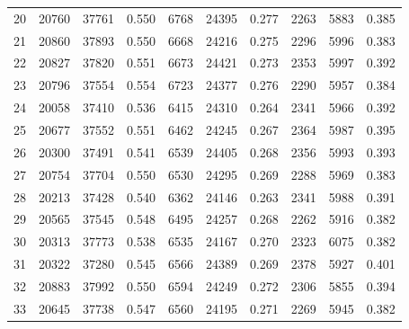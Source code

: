 \begin{table}
\begin{tabular}{c|C{1cm}C{1cm}C{1cm}|C{1cm}C{1cm}C{1cm}|C{1cm}C{1cm}C{1cm}}
20 & 20760 & 37761 & 0.550 & 6768 & 24395 & 0.277 & 2263 & 5883 & 0.385 \\
21 & 20860 & 37893 & 0.550 & 6668 & 24216 & 0.275 & 2296 & 5996 & 0.383 \\
22 & 20827 & 37820 & 0.551 & 6673 & 24421 & 0.273 & 2353 & 5997 & 0.392 \\
23 & 20796 & 37554 & 0.554 & 6723 & 24377 & 0.276 & 2290 & 5957 & 0.384 \\
24 & 20058 & 37410 & 0.536 & 6415 & 24310 & 0.264 & 2341 & 5966 & 0.392 \\
25 & 20677 & 37552 & 0.551 & 6462 & 24245 & 0.267 & 2364 & 5987 & 0.395 \\
26 & 20300 & 37491 & 0.541 & 6539 & 24405 & 0.268 & 2356 & 5993 & 0.393 \\
27 & 20754 & 37704 & 0.550 & 6530 & 24295 & 0.269 & 2288 & 5969 & 0.383 \\
28 & 20213 & 37428 & 0.540 & 6362 & 24146 & 0.263 & 2341 & 5988 & 0.391 \\
29 & 20565 & 37545 & 0.548 & 6495 & 24257 & 0.268 & 2262 & 5916 & 0.382 \\
30 & 20313 & 37773 & 0.538 & 6535 & 24167 & 0.270 & 2323 & 6075 & 0.382 \\
31 & 20322 & 37280 & 0.545 & 6566 & 24389 & 0.269 & 2378 & 5927 & 0.401 \\
32 & 20883 & 37992 & 0.550 & 6594 & 24249 & 0.272 & 2306 & 5855 & 0.394 \\
33 & 20645 & 37738 & 0.547 & 6560 & 24195 & 0.271 & 2269 & 5945 & 0.382 \\

\end{tabular}
\end{table}
